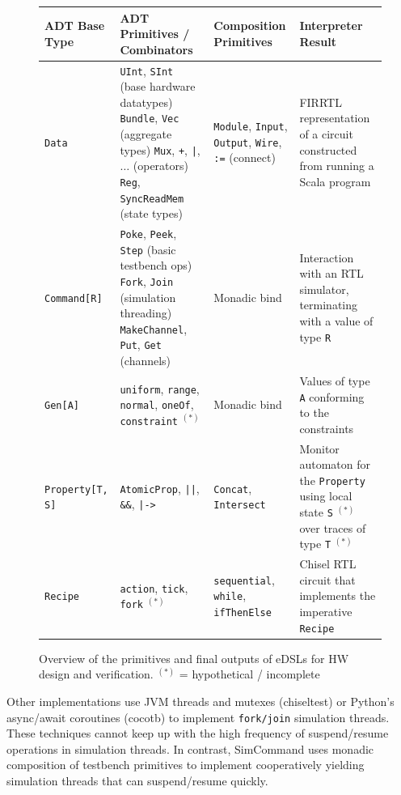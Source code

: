 \documentclass[sigplan,review,nonacm,9pt]{acmart}
\newcommand\aste{%
$^{(\ast)}$
}
\begin{document}
\begin{figure}
\small
\begin{tabular}{p{3cm}p{5cm}p{4cm}p{4cm}}\toprule
ADT Base Type & ADT Primitives / Combinators & Composition Primitives & Interpreter Result\\\midrule
\texttt{Data} \cite{chisel} & \texttt{UInt}, \texttt{SInt} (base hardware datatypes) \newline \texttt{Bundle}, \texttt{Vec} (aggregate types) \newline \texttt{Mux}, \texttt{+}, \texttt{|}, $\dots$ (operators) \newline \texttt{Reg}, \texttt{SyncReadMem} (state types) & \texttt{Module}, \texttt{Input}, \texttt{Output}, \texttt{Wire}, \texttt{:=} (connect) & FIRRTL representation of a circuit constructed from running a Scala program \\\midrule
\texttt{Command[R]} \cite{simcommand} & \texttt{Poke}, \texttt{Peek}, \texttt{Step} (basic testbench ops) \newline \texttt{Fork}, \texttt{Join} (simulation threading) \newline \texttt{MakeChannel}, \texttt{Put}, \texttt{Get} (channels) & Monadic bind & Interaction with an RTL simulator, terminating with a value of type \texttt{R}\\\midrule
\texttt{Gen[A]} \cite{randomapi} & \texttt{uniform}, \texttt{range}, \texttt{normal}, \texttt{oneOf}, \texttt{constraint}\aste & Monadic bind & Values of type \texttt{A} conforming to the constraints\\\midrule
\texttt{Property[T, S]} \cite{chiselsequences} & \texttt{AtomicProp}, \texttt{||}, \texttt{\&\&}, \texttt{|->} & \texttt{Concat}, \texttt{Intersect} & Monitor automaton for the \texttt{Property} using local state \texttt{S}\aste over traces of type \texttt{T}\aste\\\midrule
\texttt{Recipe} \cite{chisel_recipes} & \texttt{action}, \texttt{tick}, \texttt{fork}\aste & \texttt{sequential}, \texttt{while}, \texttt{ifThenElse} & Chisel RTL circuit that implements the imperative \texttt{Recipe} \\
\bottomrule
\end{tabular}
\caption{Overview of the primitives and final outputs of eDSLs for HW design and verification. {\small \aste = hypothetical / incomplete}}
\end{figure}

Other implementations use JVM threads and mutexes (chiseltest) or Python's async/await coroutines (cocotb) to implement \texttt{fork/join} simulation threads.
These techniques cannot keep up with the high frequency of suspend/resume operations in simulation threads.
In contrast, SimCommand uses monadic composition of testbench primitives\cite{hardcaml_step_testbench} to implement cooperatively yielding simulation threads that can suspend/resume quickly.
\end{document}
